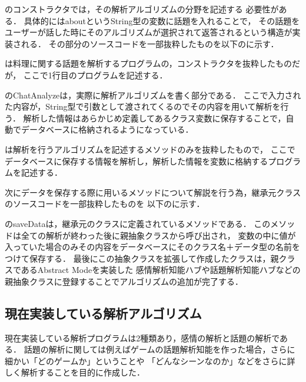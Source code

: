 のコンストラクタでは，その解析アルゴリズムの分野を記述する
必要性がある．
具体的にはaboutというString型の変数に話題を入れることで，
その話題をユーザーが話した時にそのアルゴリズムが選択されて返答されるという構造が実装される．
その部分のソースコードを一部抜粋したものを以下のに示す．


は料理に関する話題を解析するプログラムの，コンストラクタを抜粋したものだが，
ここで1行目のプログラムを記述する．

のChatAnalyzeは，実際に解析アルゴリズムを書く部分である．
ここで入力された内容が，String型で引数として渡されてくるのでその内容を用いて解析を行う．
解析した情報はあらかじめ定義してあるクラス変数に保存することで，自動でデータベースに格納されるようになっている．


は解析を行うアルゴリズムを記述するメソッドのみを抜粋したもので，
ここでデータベースに保存する情報を解析し，解析した情報を変数に格納するプログラムを記述する．

次にデータを保存する際に用いるメソッドについて解説を行う為，継承元クラスのソースコードを一部抜粋したものを
以下のに示す．

のsaveDataは，継承元のクラスに定義されているメソッドである．
このメソッドは全ての解析が終わった後に親抽象クラスから呼び出され，
変数の中に値が入っていた場合のみその内容をデータベースにそのクラス名＋データ型の名前をつけて保存する．
最後にこの抽象クラスを拡張して作成したクラスは，親クラスであるAbstract Modeを実装した
感情解析知能ハブや話題解析知能ハブなどの親抽象クラスに登録することでアルゴリズムの追加が完了する．

\subsection{現在実装している解析アルゴリズム}
現在実装している解析プログラムは2種類あり，感情の解析と話題の解析である．
話題の解析に関しては例えばゲームの話題解析知能を作った場合，さらに細かい「どのゲームか」ということや
「どんなシーンなのか」などをさらに詳しく解析することを目的に作成した．

